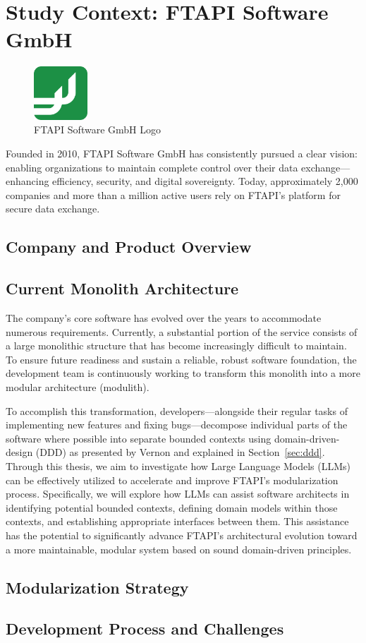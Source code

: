 \chapter{Study Context: FTAPI Software GmbH}
\begin{figure}[H]
    \centering
    \includegraphics[height=2cm]{logos/FTAPI-icon.png} 
    \caption{FTAPI Software GmbH Logo}
    \label{fig:ftapi-logo} 
  \end{figure}
Founded in 2010, FTAPI Software GmbH has consistently pursued a clear vision: enabling organizations to maintain complete control over their data exchange—enhancing efficiency, security, and digital sovereignty. Today, approximately 2,000 companies and more than a million active users rely on FTAPI's platform for secure data exchange.


\section{Company and Product Overview}
\section{Current Monolith Architecture}
The company's core software has evolved over the years to accommodate numerous requirements. Currently, a substantial portion of the service consists of a large monolithic structure that has become increasingly difficult to maintain. To ensure future readiness and sustain a reliable, robust software foundation, the development team is continuously working to transform this monolith into a more modular architecture (modulith).

To accomplish this transformation, developers—alongside their regular tasks of implementing new features and fixing bugs—decompose individual parts of the software where possible into separate bounded contexts using domain-driven-design (DDD) as presented by Vernon \autocite[p.62]{vernon2013implementing} and explained in Section~\ref{sec:ddd}. Through this thesis, we aim to investigate how Large Language Models (LLMs) can be effectively utilized to accelerate and improve FTAPI's modularization process. Specifically, we will explore how LLMs can assist software architects in identifying potential bounded contexts, defining domain models within those contexts, and establishing appropriate interfaces between them. This assistance has the potential to significantly advance FTAPI's architectural evolution toward a more maintainable, modular system based on sound domain-driven principles.

\section{Modularization Strategy}
\section{Development Process and Challenges}